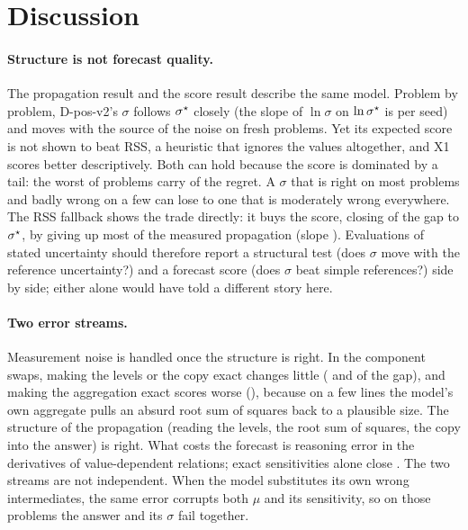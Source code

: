 \section{Discussion}
\label{sec:discussion}

\paragraph{Structure is not forecast quality.}
The propagation result and the score result describe the same model.
Problem by problem, D-pos-v2's $\sigma$ follows $\sigma^{\star}$ closely (the slope of $\ln\sigma$ on $\ln\sigma^{\star}$ is
 per seed) and moves with the source of the noise on fresh problems.
Yet its expected score is not shown to beat RSS, a heuristic that ignores the values altogether, and X1 scores better
descriptively.
Both can hold because the score is dominated by a tail: the worst  of problems carry 
of the regret.
A $\sigma$ that is right on most problems and badly wrong on a few can lose to one that is moderately wrong everywhere.
The RSS fallback shows the trade directly: it buys the score, closing  of the gap to $\sigma^{\star}$, by
giving up most of the measured propagation (slope ).
Evaluations of stated uncertainty should therefore report a structural test (does $\sigma$ move with the reference
uncertainty?) and a forecast score (does $\sigma$ beat simple references?) side by side; either alone would have told
a different story here.

\paragraph{Two error streams.}
Measurement noise is handled once the structure is right.
In the component swaps, making the levels or the copy exact changes little ( and
 of the gap), and making the aggregation exact scores worse (),
because on a few lines the model's own aggregate pulls an absurd root sum of squares back to a plausible size.
The structure of the propagation (reading the levels, the root sum of squares, the copy into the answer) is right.
What costs the forecast is reasoning error in the derivatives of value-dependent relations; exact sensitivities alone
close .
The two streams are not independent.
When the model substitutes its own wrong intermediates, the same error corrupts both $\mu$ and its sensitivity, so on
those problems the answer and its $\sigma$ fail together.

